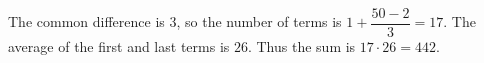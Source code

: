 The common difference is $3$, so the number of terms is $1+\dfrac{50-2}{3}=17$. The average of the first and last terms is $26$. Thus the sum is $17\cdot26=\boxed{442}$.

